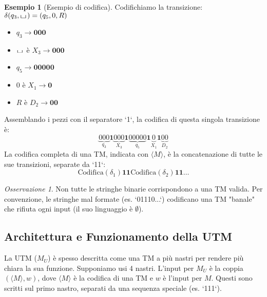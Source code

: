 \documentclass[a4paper]{article}
\theoremstyle{definition} %
\newtheorem{example}{Esempio}
\newcommand{\blankS}{\ensuremath{\raisebox{-0.15ex}{\scalebox{1.3}[0.7]{$\sqcup$}}\mkern2mu}}
\theoremstyle{remark} %
\newtheorem{remark}{Osservazione}
\begin{document}
\begin{example}[Esempio di codifica]
Codifichiamo la transizione: $\delta(q_3, \blankS) = (q_5, 0, R)$
\begin{itemize}
    \item $q_3 \rightarrow \textbf{000}$
    \item $\blankS$ è $X_3 \rightarrow \textbf{000}$
    \item $q_5 \rightarrow \textbf{00000}$
    \item $0$ è $X_1 \rightarrow \textbf{0}$
    \item $R$ è $D_2 \rightarrow \textbf{00}$
\end{itemize}
Assemblando i pezzi con il separatore `1`, la codifica di questa singola transizione è:
\[ \underbrace{000}_{q_3} \mathbf{1} \underbrace{000}_{X_3} \mathbf{1} \underbrace{00000}_{q_5} \mathbf{1} \underbrace{0}_{X_1} \mathbf{1} \underbrace{00}_{D_2} \]
La codifica completa di una TM, indicata con $\langle M \rangle$, è la concatenazione di tutte le sue transizioni, separate da `11`:
\[ \text{Codifica}(\delta_1) \mathbf{11} \text{Codifica}(\delta_2) \mathbf{11} \dots \]
\end{example}

\begin{remark}
Non tutte le stringhe binarie corrispondono a una TM valida. Per convenzione, le stringhe mal formate (es. `01110...`) codificano una TM "banale" che rifiuta ogni input (il suo linguaggio è $\emptyset$).
\end{remark}

\subsection{Architettura e Funzionamento della UTM}

La UTM ($M_U$) è spesso descritta come una TM a più nastri per rendere più chiara la sua funzione. Supponiamo usi 4 nastri. L'input per $M_U$ è la coppia $(\langle M \rangle, w)$, dove $\langle M \rangle$ è la codifica di una TM e $w$ è l'input per $M$. Questi sono scritti sul primo nastro, separati da una sequenza speciale (es. `111`).
\end{document}
